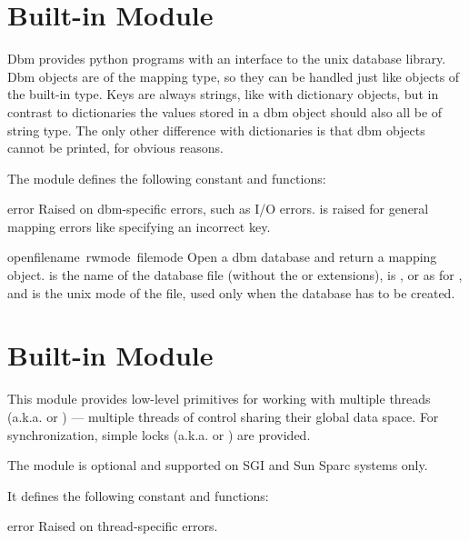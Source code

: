 \section{Built-in Module }

Dbm provides python programs with an interface to the unix 
database library. Dbm objects are of the mapping type, so they can be
handled just like objects of the built-in  type. Keys
are always strings, like with dictionary objects, but in contrast to
dictionaries the values stored in a dbm object should also all be of
string type. The only other difference with dictionaries is that dbm
objects cannot be printed, for obvious reasons.

The module defines the following constant and functions:

\renewcommand{\indexsubitem}{(in module dbm)}
\begin{excdesc}{error}
Raised on dbm-specific errors, such as I/O errors.  is
raised for general mapping errors like specifying an incorrect key.
\end{excdesc}

\begin{funcdesc}{open}{filename\, rwmode\, filemode}
Open a dbm database and return a mapping object.   is
the name of the database file (without the  or 
extensions),  is ,  or  as for
, and  is the unix mode of the file, used only
when the database has to be created.
\end{funcdesc}

\section{Built-in Module }

This module provides low-level primitives for working with multiple
threads (a.k.a.  or ) --- multiple
threads of control sharing their global data space.  For
synchronization, simple locks (a.k.a.  or ) are provided.

The module is optional and supported on SGI and Sun Sparc systems only.

It defines the following constant and functions:

\renewcommand{\indexsubitem}{(in module thread)}
\begin{excdesc}{error}
Raised on thread-specific errors.
\end{excdesc}

